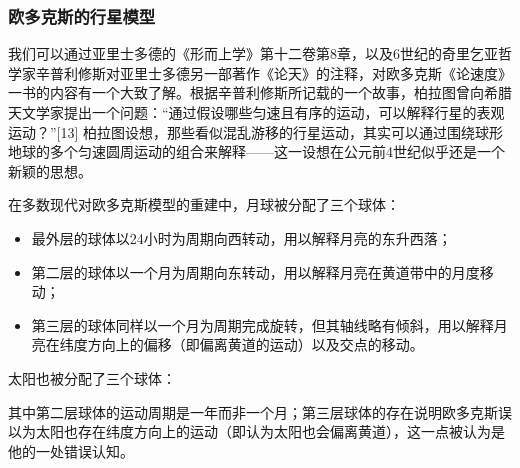 \subsubsection{欧多克斯的行星模型}
我们可以通过亚里士多德的《形而上学》第十二卷第8章，以及6世纪的奇里乞亚哲学家辛普利修斯对亚里士多德另一部著作《论天》的注释，对欧多克斯《论速度》一书的内容有一个大致了解。根据辛普利修斯所记载的一个故事，柏拉图曾向希腊天文学家提出一个问题：“通过假设哪些匀速且有序的运动，可以解释行星的表观运动？”[13] 柏拉图设想，那些看似混乱游移的行星运动，其实可以通过围绕球形地球的多个匀速圆周运动的组合来解释——这一设想在公元前4世纪似乎还是一个新颖的思想。

在多数现代对欧多克斯模型的重建中，月球被分配了三个球体：
\begin{itemize}
\item 最外层的球体以24小时为周期向西转动，用以解释月亮的东升西落；
\item 第二层的球体以一个月为周期向东转动，用以解释月亮在黄道带中的月度移动；
\item 第三层的球体同样以一个月为周期完成旋转，但其轴线略有倾斜，用以解释月亮在纬度方向上的偏移（即偏离黄道的运动）以及交点的移动。
\end{itemize}
太阳也被分配了三个球体：

其中第二层球体的运动周期是一年而非一个月；第三层球体的存在说明欧多克斯误以为太阳也存在纬度方向上的运动（即认为太阳也会偏离黄道），这一点被认为是他的一处错误认知。

